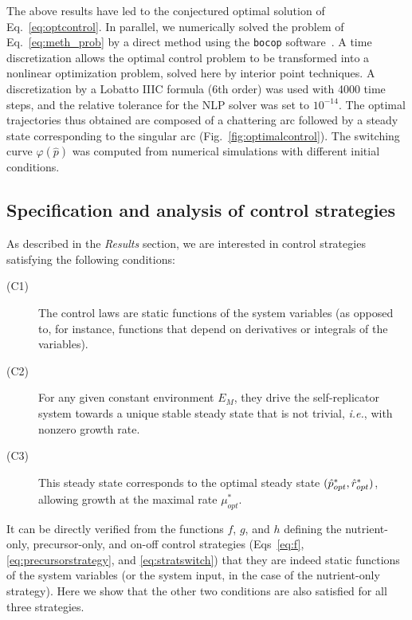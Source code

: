 The above results have led to the conjectured optimal solution of Eq.~\ref{eq:optcontrol}.
In parallel, we numerically solved the problem of Eq.~\ref{eq:meth_prob} by a direct method using the \texttt{bocop} software~\cite{bonnans_bocop_2012}.
A time discretization allows the optimal control problem to be transformed into a nonlinear optimization problem,
solved here by interior point techniques.
A discretization by a Lobatto IIIC formula (6th order) was used with 4000 time steps, and the relative tolerance for the NLP solver was set to $10^{-14}$.
The optimal trajectories thus obtained are composed of a chattering arc followed by a steady state corresponding to the singular arc (Fig.~\ref{fig:optimalcontrol}).
The switching curve $\varphi(\hat{p})$ was computed from numerical simulations with different initial conditions. 

\subsection{Specification and analysis of control strategies}

As described in the \textit{Results} section, we are interested in control strategies satisfying the following conditions:
\begin{description}
\item[(C1)] The control laws are static functions of the system variables (as opposed to, for instance, functions that depend on derivatives or integrals of the variables).
\item[(C2)] For any given constant environment $E_M$, they drive the self-rep\-li\-cat\-or system towards a unique stable steady state that is not trivial, \textit{i.e.}, with nonzero growth rate.
\item[(C3)] This steady state corresponds to the optimal steady state $(\hat{p}_{opt}^*, \linebreak \hat{r}_{opt}^*)$, allowing growth at the maximal rate $\mu^*_{opt}$.
\end{description}
It can be directly verified from the functions $f$, $g$, and $h$ defining the nutrient-only, precursor-only, and on-off control strategies (Eqs~\ref{eq:f}, \ref{eq:precursorstrategy}, and \ref{eq:stratswitch}) that they are indeed static functions of the system variables (or the system input, in the case of the nutrient-only strategy). 
Here we show that the other two conditions are also satisfied for all three strategies.

